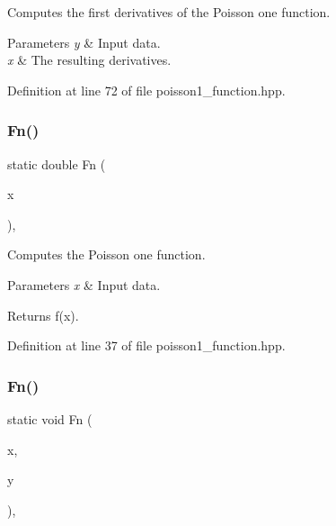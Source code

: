 Computes the first derivatives of the Poisson one function. 


\begin{DoxyParams}{Parameters}
{\em y} & Input data. \\
\hline
{\em x} & The resulting derivatives. \\
\hline
\end{DoxyParams}


Definition at line 72 of file poisson1\+\_\+function.\+hpp.

\mbox{\label{classmlpack_1_1ann_1_1Poisson1Function_a11bd9a1195e6b107f9fee73643bc328b}} 
\subsubsection{Fn()\hspace{0.1cm}{\footnotesize\ttfamily [1/2]}}
{\footnotesize\ttfamily static double Fn (\begin{DoxyParamCaption}\item[{const double}]{x }\end{DoxyParamCaption})\hspace{0.3cm}{\ttfamily [inline]}, {\ttfamily [static]}}



Computes the Poisson one function. 


\begin{DoxyParams}{Parameters}
{\em x} & Input data. \\
\hline
\end{DoxyParams}
\begin{DoxyReturn}{Returns}
f(x). 
\end{DoxyReturn}


Definition at line 37 of file poisson1\+\_\+function.\+hpp.

\mbox{\label{classmlpack_1_1ann_1_1Poisson1Function_af6cf5da90eb6312e3e25c9b8bd9c3527}} 
\subsubsection{Fn()\hspace{0.1cm}{\footnotesize\ttfamily [2/2]}}
{\footnotesize\ttfamily static void Fn (\begin{DoxyParamCaption}\item[{const Input\+Vec\+Type \&}]{x,  }\item[{Output\+Vec\+Type \&}]{y }\end{DoxyParamCaption})\hspace{0.3cm}{\ttfamily [inline]}, {\ttfamily [static]}}



